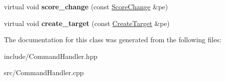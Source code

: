 \begin{DoxyCompactItemize}
\item 
\hypertarget{class_command_handler_a539b994b6264c5c286c7551580e7b5a0}{virtual void {\bfseries score\-\_\-change} (const \hyperlink{class_score_change}{Score\-Change} \&pe)}\label{class_command_handler_a539b994b6264c5c286c7551580e7b5a0}

\item 
\hypertarget{class_command_handler_a573af2e6e934d0ede953d715a92f7a43}{virtual void {\bfseries create\-\_\-target} (const \hyperlink{class_create_target}{Create\-Target} \&pe)}\label{class_command_handler_a573af2e6e934d0ede953d715a92f7a43}

\end{DoxyCompactItemize}


The documentation for this class was generated from the following files\-:\begin{DoxyCompactItemize}
\item 
include/Command\-Handler.\-hpp\item 
src/Command\-Handler.\-cpp\end{DoxyCompactItemize}
